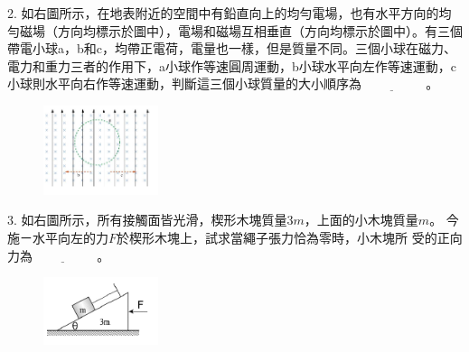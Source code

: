 \documentclass[cn,10pt,math=newtx,chinesefont=founder,device=ig]{elegantbook}
\begin{document}
\newpage


\begin{example}
   2. 如右圖所示，在地表附近的空間中有鉛直向上的均勻電場，也有水平方向的均勻磁場（方向均標示於圖中），電場和磁場互相垂直（方向均標示於圖中）。有三個帶電小球a，b和c，均帶正電荷，電量也一樣，但是質量不同。三個小球在磁力、電力和重力三者的作用下，a小球作等速圓周運動，b小球水平向左作等速運動，c小球則水平向右作等速運動，判斷這三個小球質量的大小順序為$\underline{\hspace{2cm}}$ 。\\
    \rightline{[中壢高中教甄109]}
\end{example}
\begin{solution}
    
\end{solution}
\begin{figure}[htbp]
    \flushright
    \includegraphics[width=0.3\textwidth]{image/109中壢2.png}
  \end{figure}
\newpage


\begin{example}
   3. 如右圖所示，所有接觸面皆光滑，楔形木塊質量3$m$，上面的小木塊質量$m$。
今施ㄧ水平向左的力$F$於楔形木塊上，試求當繩子張力恰為零時，小木塊所
受的正向力為$\underline{\hspace{2cm}}$ 。\\
    \rightline{[中壢高中教甄109]}
\end{example}
\begin{solution}
    
\end{solution}
\begin{figure}[htbp]
    \flushright
    \includegraphics[width=0.3\textwidth]{image/109中壢3.png}
  \end{figure}
\newpage
\end{document}
